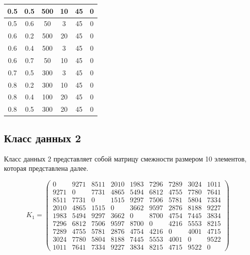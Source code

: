 \begin{center}
\begin{longtable}[c]{|c|c|c|c|c|c|}
        0.5 &  0.5 &  500 &   10 &    45 &     0 \\ \hline
        0.5 &  0.6 &   50 &    3 &    45 &     0 \\ \hline
        0.6 &  0.2 &  500 &   20 &    45 &     0 \\ \hline
        0.6 &  0.4 &  500 &    3 &    45 &     0 \\ \hline
        0.6 &  0.7 &   50 &   10 &    45 &     0 \\ \hline
        0.7 &  0.5 &  300 &    3 &    45 &     0 \\ \hline 
        0.8 &  0.2 &  300 &   10 &    45 &     0 \\ \hline
        0.8 &  0.4 &  100 &   20 &    45 &     0 \\ \hline
        0.8 &  0.5 &  300 &   20 &    45 &     0 \\ \hline
\end{longtable}
\end{center}


\subsection{Класс данных 2}

Класс данных 2 представляет собой матрицу смежности размером 10 элементов, которая представлена далее.

\begin{equation}
    \label{eq:kd2}
	K_{1} = \begin{pmatrix}
		0 & 9271 & 8511 & 2010 & 1983 & 7296 & 7289 & 3024 & 1011 \\
        9271 & 0 & 7731 & 4865 & 5494 & 6812 & 4755 & 7780 & 7641 \\
        8511 & 7731 & 0 & 1515 & 9297 & 7506 & 5781 & 5804 & 7334 \\
        2010 & 4865 & 1515 & 0 & 3662 & 9597 & 2876 & 8188 & 9227 \\
        1983 & 5494 & 9297 & 3662 & 0 & 8700 & 4754 & 7445 & 3834 \\
        7296 & 6812 & 7506 & 9597 & 8700 & 0 & 4216 & 5553 & 8215 \\
        7289 & 4755 & 5781 & 2876 & 4754 & 4216 & 0 & 4001 & 4715 \\
        3024 & 7780 & 5804 & 8188 & 7445 & 5553 & 4001 & 0 & 9522 \\
        1011 & 7641 & 7334 & 9227 & 3834 & 8215 & 4715 & 9522 & 0 
	\end{pmatrix}
\end{equation}



